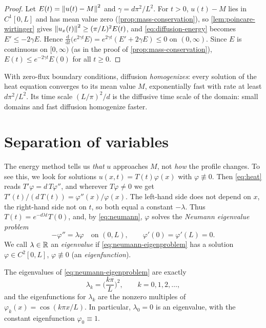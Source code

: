 \begin{proof}
Let $E(t)=\left\lVert u(t)-M\right\rVert^2$ and $\gamma=d\pi^2/L^2$. For $t>0$, $u(t)-M$ lies in
$C^1[0,L]$ and has mean value zero (\cref{prop:mass-conservation}), so
\cref{lem:poincare-wirtinger} gives $\left\lVert u_x(t)\right\rVert^2\ge(\pi/L)^2E(t)$, and
\eqref{eq:diffusion-energy} becomes $E'\le-2\gamma E$. Hence
$\frac{\mathrm d}{\mathrm dt}\big(e^{2\gamma t}E\big)=e^{2\gamma t}(E'+2\gamma E)\le0$
on $(0,\infty)$. Since $E$ is continuous on $[0,\infty)$ (as in the proof of
\cref{prop:mass-conservation}), $E(t)\le e^{-2\gamma t}E(0)$ for all $t\ge0$.
\end{proof}

\begin{keyidea}
With zero-flux boundary conditions, diffusion \emph{homogenizes}: every solution of
the heat equation converges to its mean value $M$, exponentially fast with rate at
least $d\pi^2/L^2$. Its time scale $(L/\pi)^2/d$ is the diffusive time scale of the
domain: small domains and fast diffusion homogenize faster.
\end{keyidea}

\section{Separation of variables}\label{sec:diffusion-separation}

The energy method tells us \emph{that} $u$ approaches $M$, not \emph{how} the profile
changes. To see this, we look for solutions $u(x,t)=T(t)\varphi(x)$ with
$\varphi\not\equiv0$. Then \eqref{eq:heat} reads $T'\varphi=d\,T\varphi''$, and
wherever $T\varphi\neq0$ we get $T'(t)/(d\,T(t))=\varphi''(x)/\varphi(x)$. The
left-hand side does not depend on $x$, the right-hand side not on $t$, so both equal a
constant $-\lambda$. Thus $T(t)=e^{-d\lambda t}T(0)$, and, by \eqref{eq:neumann},
$\varphi$ solves the \emph{Neumann eigenvalue problem}
\begin{equation}\label{eq:neumann-eigenproblem}
  -\varphi'' = \lambda\varphi\quad\text{on } (0,L),\qquad \varphi'(0)=\varphi'(L)=0 .
\end{equation}
We call $\lambda\in\mathbb{R}$ an \emph{eigenvalue} if \eqref{eq:neumann-eigenproblem} has
a solution $\varphi\in C^2[0,L]$, $\varphi\not\equiv0$ (an \emph{eigenfunction}).

\begin{proposition}\label{prop:neumann-eigen}
The eigenvalues of \eqref{eq:neumann-eigenproblem} are exactly
\begin{equation*}
  \lambda_k = \Big(\frac{k\pi}{L}\Big)^2,\qquad k=0,1,2,\dots,
\end{equation*}
and the eigenfunctions for $\lambda_k$ are the nonzero multiples of
$\varphi_k(x)=\cos(k\pi x/L)$. In particular, $\lambda_0=0$ is an eigenvalue, with
the constant eigenfunction $\varphi_0\equiv1$.
\end{proposition}

